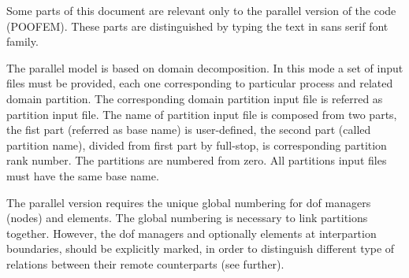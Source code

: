 \documentclass[a4paper]{article}
\newcommand{\Pmode}[1]{{\sffamily #1}}
\begin{document}
\Pmode{Some parts of this document are relevant only to the parallel version of the code (POOFEM).
These parts are distinguished by typing the text in sans serif font family.}
\Pmode{The parallel model is based on domain decomposition. In this mode a set of input files must be provided, each one corresponding to 
particular process and related domain partition. The corresponding domain partition input file is referred as partition input file. 
The name of partition input file is composed from two parts, the fist part (referred as base
name) is user-defined, the second part (called partition name), divided from first part by
full-stop, is corresponding partition rank number. The partitions are numbered
from zero. All partitions input files must have the
same base name.

The parallel version requires the unique global numbering  for
dof managers (nodes) and elements. The global
numbering is necessary to link partitions together. However, the dof
managers and optionally elements at interpartion boundaries,
should be explicitly  marked, in order to distinguish different type
of relations between their remote counterparts (see further).
}
\end{document}
